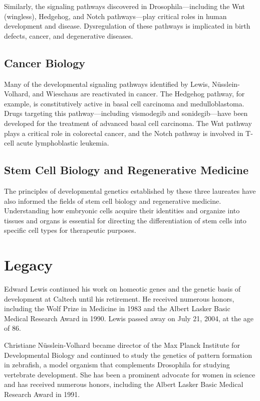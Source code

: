 Similarly, the signaling pathways discovered in Drosophila---including the Wnt (wingless), Hedgehog, and Notch pathways---play critical roles in human development and disease. Dysregulation of these pathways is implicated in birth defects, cancer, and degenerative diseases.

\subsection{Cancer Biology}

Many of the developmental signaling pathways identified by Lewis, N\"usslein-Volhard, and Wieschaus are reactivated in cancer. The Hedgehog pathway, for example, is constitutively active in basal cell carcinoma and medulloblastoma. Drugs targeting this pathway---including vismodegib and sonidegib---have been developed for the treatment of advanced basal cell carcinoma. The Wnt pathway plays a critical role in colorectal cancer, and the Notch pathway is involved in T-cell acute lymphoblastic leukemia.

\subsection{Stem Cell Biology and Regenerative Medicine}

The principles of developmental genetics established by these three laureates have also informed the fields of stem cell biology and regenerative medicine. Understanding how embryonic cells acquire their identities and organize into tissues and organs is essential for directing the differentiation of stem cells into specific cell types for therapeutic purposes.

\section{Legacy}

Edward Lewis continued his work on homeotic genes and the genetic basis of development at Caltech until his retirement. He received numerous honors, including the Wolf Prize in Medicine in 1983 and the Albert Lasker Basic Medical Research Award in 1990. Lewis passed away on July 21, 2004, at the age of 86.

Christiane N\"usslein-Volhard became director of the Max Planck Institute for Developmental Biology and continued to study the genetics of pattern formation in zebrafish, a model organism that complements Drosophila for studying vertebrate development. She has been a prominent advocate for women in science and has received numerous honors, including the Albert Lasker Basic Medical Research Award in 1991.

